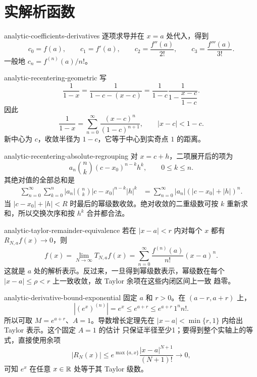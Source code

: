 \chapter{实解析函数}
\label{chap:real-analytic-functions-solutions}

\begin{solution}{analytic-coefficients-derivatives}
逐项求导并在 \(x=a\) 处代入，得到
\[
 c_0=f(a),\qquad c_1=f'(a),\qquad
 c_2=\frac{f''(a)}{2!},\qquad
 c_3=\frac{f'''(a)}{3!}.
\]
一般地 \(c_n=f^{(n)}(a)/n!\)。
\end{solution}

\begin{solution}{analytic-recentering-geometric}
写
\[
 \frac1{1-x}
 =\frac1{1-c-(x-c)}
 =\frac1{1-c}\frac1{1-\dfrac{x-c}{1-c}}.
\]
因此
\[
 \frac1{1-x}
 =\sum_{n=0}^\infty\frac{(x-c)^n}{(1-c)^{n+1}},
 \qquad |x-c|<1-c.
\]
新中心为 \(c\)，收敛半径为 \(1-c\)，它等于中心到实奇点 \(1\) 的距离。
\end{solution}

\begin{solution}{analytic-recentering-absolute-regrouping}
对 \(x=c+h\)，二项展开后的项为
\[
 a_n\binom nk(c-x_0)^{n-k}h^k,\qquad0\le k\le n.
\]
其绝对值的全部总和是
\[
\begin{aligned}
 \sum_{n=0}^\infty\sum_{k=0}^n
 |a_n|\binom nk|c-x_0|^{n-k}|h|^k
 &=\sum_{n=0}^\infty|a_n|
 (|c-x_0|+|h|)^n.
\end{aligned}
\]
当 \(|c-x_0|+|h|<R\) 时最后的幂级数收敛。绝对收敛的二重级数可按
\(k\) 重新求和，所以交换次序和按 \(h^k\) 合并都合法。
\end{solution}

\begin{solution}{analytic-taylor-remainder-equivalence}
若在 \(|x-a|<r\) 内对每个 \(x\) 都有 \(R_{N,a}f(x)\to0\)，则
\[
 f(x)=\lim_{N\to\infty}T_{N,a}f(x)
 =\sum_{n=0}^\infty\frac{f^{(n)}(a)}{n!}(x-a)^n.
\]
这就是 \(a\) 处的解析表示。反过来，一旦得到幂级数表示，幂级数在每个
\(|x-a|\le\rho<r\) 上一致收敛，故 Taylor 余项在这些内闭区间上一致
趋零。
\end{solution}

\begin{solution}{analytic-derivative-bound-exponential}
固定 \(a\) 和 \(r>0\)。在 \((a-r,a+r)\) 上，
\[
 |(e^x)^{(n)}|=e^x\le e^{a+r}\le e^{a+r}\,1^n n!.
\]
所以可取 \(M=e^{a+r}\)、\(A=1\)。导数增长定理先在
\(|x-a|<\min\{r,1\}\) 内给出 Taylor 表示。这个固定 \(A=1\) 的估计
只保证半径至少1；要得到整个实轴上的等式，直接使用余项
\[
 |R_N(x)|\le e^{\max\{a,x\}}\frac{|x-a|^{N+1}}{(N+1)!}\to0,
\]
可知 \(e^x\) 在任意 \(x\in\mathbb{R}\) 处等于其 Taylor 级数。
\end{solution}

